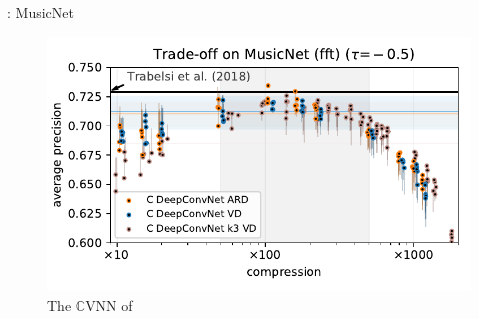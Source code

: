 \documentclass{beamer}
\newcommand{\real}{\mathbb{R}}
\newcommand{\cplx}{\mathbb{C}}
\begin{document}
\begin{frame}[c]{\insertsection: MusicNet}
  \begin{figure}[t]
    \centering
    \includegraphics[width=\linewidth]{figure__musicnet__trade-off/paper__musicnetram__fft__-0.5.pdf}
    \\
    {The $\cplx$VNN of \citet{trabelsi_deep_2018}}
  \end{figure}


\end{frame}
\end{document}
